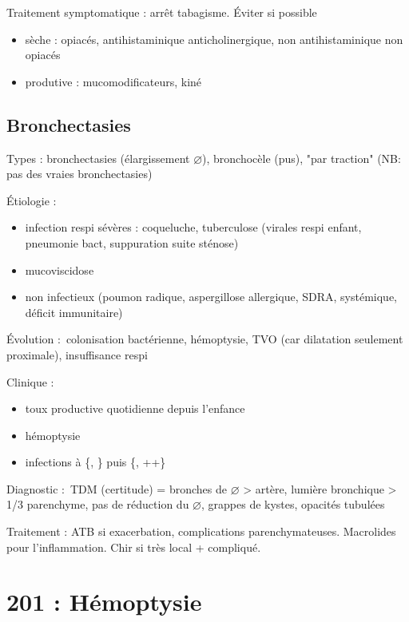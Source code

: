 Traitement symptomatique : arrêt tabagisme. Éviter si possible
\begin{itemize}
  \item sèche : opiacés, antihistaminique anticholinergique, non
    antihistaminique non opiacés
  \item produtive : mucomodificateurs, kiné
\end{itemize}

\subsection{Bronchectasies}
\label{sub:bronchectasies}
Types : bronchectasies (élargissement $\diameter$), bronchocèle (pus), "par
traction" (NB: pas des vraies bronchectasies)


Étiologie : 
\begin{itemize}
  \item infection respi sévères : coqueluche, tuberculose (virales respi enfant,
    pneumonie bact, suppuration suite sténose)
  \item mucoviscidose
  \item non infectieux (poumon radique, aspergillose allergique, SDRA,
    systémique, déficit immunitaire)
\end{itemize}

Évolution : colonisation bactérienne, hémoptysie, TVO (car dilatation seulement
proximale), insuffisance respi

Clinique :
\begin{itemize}
  \item toux productive quotidienne depuis l'enfance
  \item hémoptysie
  \item infections à \{, \} puis \{,
    ++\}
\end{itemize}

Diagnostic : TDM (certitude) = bronches de $\diameter$ > artère, lumière
bronchique > 1/3 parenchyme, pas de réduction du $\diameter$, grappes de kystes,
opacités tubulées

Traitement : ATB si exacerbation, complications parenchymateuses. Macrolides
pour l'inflammation. Chir si très local + compliqué.

\section{201 : Hémoptysie}%
\label{sec:201_hemoptysie}

